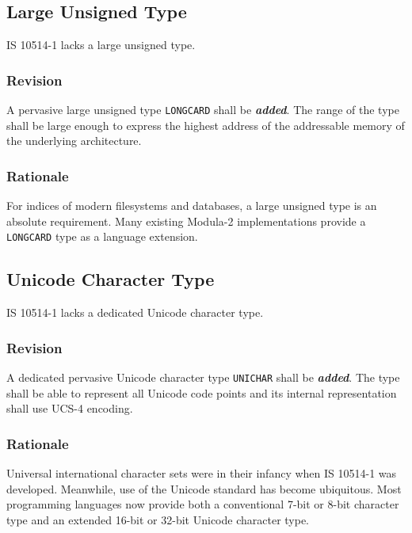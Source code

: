 \documentclass[10pt,a4paper,leqno,fleqn]{article}
\renewcommand{\emph}[1]{\textbf{\textit{#1}}}
\begin{document}
\subsection{Large Unsigned Type}

IS 10514-1 lacks a large unsigned type.

\subsubsection{Revision}

A pervasive large unsigned type \texttt{LONGCARD} shall be \emph{added}.
The range of the type shall be large enough to express the highest
address of the addressable memory of the underlying architecture.

\subsubsection{Rationale}

For indices of modern filesystems and databases, a large unsigned type
is an absolute requirement. Many existing Modula-2 implementations
provide a \texttt{LONGCARD} type as a language extension.


\subsection{Unicode Character Type}

IS 10514-1 lacks a dedicated Unicode character type.

\subsubsection{Revision}

A dedicated pervasive Unicode character type \texttt{UNICHAR} shall be
\emph{added}. The type shall be able to represent all Unicode code points
and its internal representation shall use \mbox{UCS-4} encoding.

\subsubsection{Rationale}

Universal international character sets were in their infancy when IS 10514-1 was
developed. Meanwhile, use of the Unicode standard \cite{Unicode2019} has become
ubiquitous. Most programming languages now provide both a conventional 7-bit
or 8-bit character type and an extended 16-bit or 32-bit Unicode character type.
\end{document}

